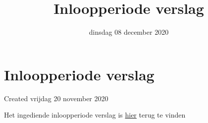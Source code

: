 \documentclass{scrartcl}
\title{Inloopperiode verslag}
\date{dinsdag 08 december 2020}
\author{}
\begin{document}
\maketitle

		\section{Inloopperiode verslag}

Created vrijdag 20 november 2020



Het ingediende inloopperiode verslag is \href{file:///Users/larsdepauw/Documents/Lars.nosync/Documents/School/1Ma%20ing/Masterproef/officiele%20documenten/Verslagen/Inloopperiode%20verslag/Definitief/InloopPeriodeVerslag_TWI.pdf}{hier} terug te vinden
\end{document}
